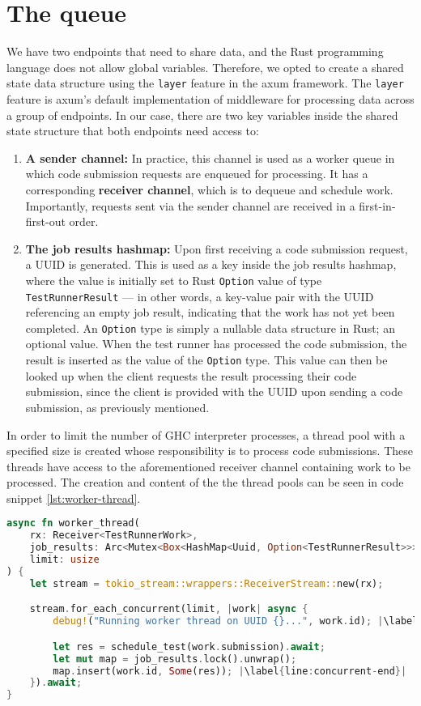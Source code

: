 \section{The queue}
We have two endpoints that need to share data, and the Rust programming language does not allow global variables.
Therefore, we opted to create a shared state data structure using the \texttt{layer} feature in the axum framework.
The \texttt{layer} feature is axum's default implementation of middleware for processing data across a group of endpoints.
In our case, there are two key variables inside the shared state structure that both endpoints need access to:
\begin{enumerate}
    \item \textbf{A sender channel:} In practice, this channel is used as a worker queue in which code submission requests are enqueued for processing. It has a corresponding \textbf{receiver channel}, which is to dequeue and schedule work. Importantly, requests sent via the sender channel are received in a first-in-first-out order.
    \item \textbf{The job results hashmap:} Upon first receiving a code submission request, a UUID is generated. This is used as a key inside the job results hashmap, where the value is initially set to Rust \texttt{Option} value of type \texttt{TestRunnerResult} --- in other words, a key-value pair with the UUID referencing an empty job result, indicating that the work has not yet been completed. An \texttt{Option} type is simply a nullable data structure in Rust; an optional value. When the test runner has processed the code submission, the result is inserted as the value of the \texttt{Option} type. This value can then be looked up when the client requests the result processing their code submission, since the client is provided with the UUID upon sending a code submission, as previously mentioned.
\end{enumerate}

In order to limit the number of GHC interpreter processes, a thread pool with a specified size is created whose responsibility is to process code submissions.
These threads have access to the aforementioned receiver channel containing work to be processed.
The creation and content of the the thread pools can be seen in code snippet \ref{lst:worker-thread}.

\begin{lstlisting}[language=rust, escapechar=|, caption={Rust code showing allocation of thread pools and scheduling of code submission processing.}, label={lst:worker-thread}]
async fn worker_thread(
    rx: Receiver<TestRunnerWork>,
    job_results: Arc<Mutex<Box<HashMap<Uuid, Option<TestRunnerResult>>>>>,
    limit: usize
) {
    let stream = tokio_stream::wrappers::ReceiverStream::new(rx);

    stream.for_each_concurrent(limit, |work| async {
        debug!("Running worker thread on UUID {}...", work.id); |\label{line:concurrent-start}|

        let res = schedule_test(work.submission).await;
        let mut map = job_results.lock().unwrap();
        map.insert(work.id, Some(res)); |\label{line:concurrent-end}|
    }).await;
}
\end{lstlisting}

